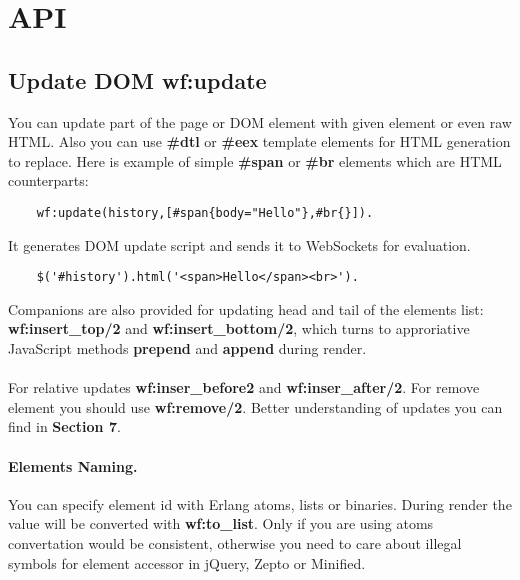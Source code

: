 \section{API}

\subsection{Update DOM \bf{wf:update}}
You can update part of the page or DOM element with given
element or even raw HTML. Also you can use {\bf \#dtl}
or {\bf \#eex} template elements for HTML generation to
replace. Here is example of simple {\bf \#span} or
{\bf \#br} elements which are HTML counterparts:

\vspace{1\baselineskip}
\begin{lstlisting}
    wf:update(history,[#span{body="Hello"},#br{}]).
\end{lstlisting}
\vspace{1\baselineskip}

It generates DOM update script and sends it to
WebSockets for evaluation.

\vspace{1\baselineskip}
\begin{lstlisting}
    $('#history').html('<span>Hello</span><br>').
\end{lstlisting}
\vspace{1\baselineskip}

Companions are also provided for updating head and tail
of the elements list: {\bf wf:insert\_top/2} and
{\bf wf:insert\_bottom/2}, which turns to approriative
JavaScript methods {\bf prepend} and {\bf append} during render.

\paragraph{}
For relative updates {\bf wf:inser\_before\/2} and {\bf wf:inser\_after/2}.
For remove element you should use {\bf wf:remove/2}.
Better understanding of updates you can find in {\bf Section 7}.

\paragraph{\bf Elements Naming.} You can specify element id with Erlang atoms,
lists or binaries. During render the value will be converted
with {\bf wf:to\_list}. Only if you are using atoms convertation would be consistent,
otherwise you need to care about illegal symbols for element accessor
in jQuery, Zepto or Minified.

